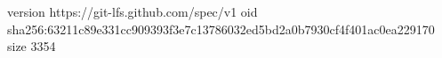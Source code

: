 version https://git-lfs.github.com/spec/v1
oid sha256:63211c89e331cc909393f3e7c13786032ed5bd2a0b7930cf4f401ac0ea229170
size 3354
